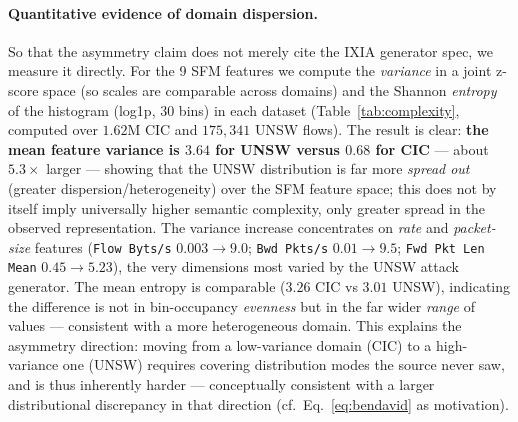 \documentclass[preprint,12pt,authoryear]{elsarticle}
\begin{document}
\paragraph{Quantitative evidence of domain dispersion.} So that the asymmetry claim
does not merely cite the IXIA generator spec, we measure it directly.
For the 9 SFM features we compute the \emph{variance} in a joint z-score space (so
scales are comparable across domains) and the Shannon \emph{entropy} of the
histogram (log1p, 30 bins) in each dataset (Table~\ref{tab:complexity}, computed
over $1.62$M CIC and $175{,}341$ UNSW flows). The result is clear: \textbf{the
mean feature variance is $3.64$ for UNSW versus $0.68$ for CIC} --- about
$5.3\times$ larger --- showing that the UNSW distribution is far
more \emph{spread out} (greater dispersion/heterogeneity) over the SFM feature
space; this does not by itself imply universally higher semantic complexity, only
greater spread in the observed representation. The variance increase
concentrates on \emph{rate} and \emph{packet-size} features (\texttt{Flow Byts/s}
$0.003\rightarrow 9.0$; \texttt{Bwd Pkts/s} $0.01\rightarrow 9.5$;
\texttt{Fwd Pkt Len Mean} $0.45\rightarrow 5.23$), the very dimensions most varied
by the UNSW attack generator. The mean entropy is comparable ($3.26$ CIC vs $3.01$
UNSW), indicating the difference is not in bin-occupancy \emph{evenness} but in the
far wider \emph{range} of values --- consistent with a more heterogeneous domain.
This explains the asymmetry direction: moving from a low-variance domain (CIC) to a
high-variance one (UNSW) requires covering distribution modes the source never
saw, and is thus inherently harder --- conceptually consistent with a larger
distributional discrepancy in that direction (cf.\ Eq.~\eqref{eq:bendavid} as
motivation).
\end{document}

